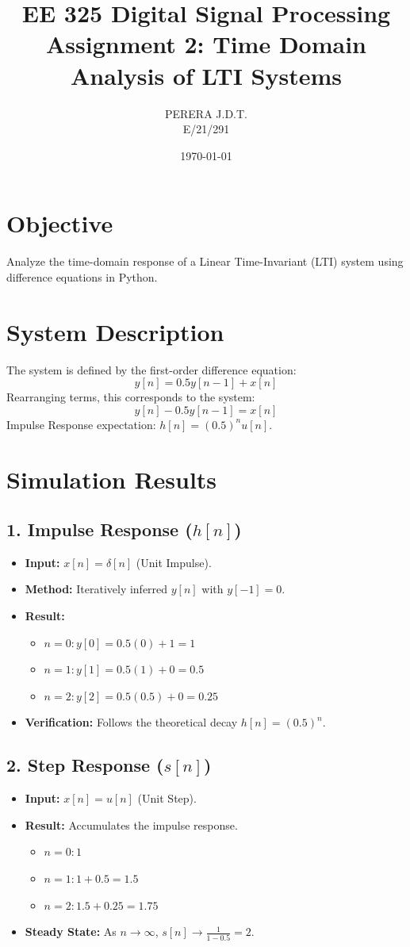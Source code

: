 \documentclass[11pt, a4paper]{article}
\title{EE 325 Digital Signal Processing \\ Assignment 2: Time Domain Analysis of LTI Systems}
\author{PERERA J.D.T. \\ E/21/291}
\date{\today}
\begin{document}
\maketitle

\section{Objective}
Analyze the time-domain response of a Linear Time-Invariant (LTI) system using difference equations in Python.

\section{System Description}
The system is defined by the first-order difference equation:
$$y[n] = 0.5 y[n-1] + x[n]$$
Rearranging terms, this corresponds to the system:
$$y[n] - 0.5 y[n-1] = x[n]$$
Impulse Response expectation: $h[n] = (0.5)^n u[n]$.

\section{Simulation Results}
\subsection{1. Impulse Response ($h[n]$)}
\begin{itemize}
    \item \textbf{Input:} $x[n] = \delta[n]$ (Unit Impulse).
    \item \textbf{Method:} Iteratively inferred $y[n]$ with $y[-1]=0$.
    \item \textbf{Result:}
    \begin{itemize}
        \item $n=0: y[0] = 0.5(0) + 1 = 1$
        \item $n=1: y[1] = 0.5(1) + 0 = 0.5$
        \item $n=2: y[2] = 0.5(0.5) + 0 = 0.25$
    \end{itemize}
    \item \textbf{Verification:} Follows the theoretical decay $h[n] = (0.5)^n$.
\end{itemize}

\subsection{2. Step Response ($s[n]$)}
\begin{itemize}
    \item \textbf{Input:} $x[n] = u[n]$ (Unit Step).
    \item \textbf{Result:} Accumulates the impulse response.
    \begin{itemize}
        \item $n=0: 1$
        \item $n=1: 1 + 0.5 = 1.5$
        \item $n=2: 1.5 + 0.25 = 1.75$
    \end{itemize}
    \item \textbf{Steady State:} As $n \to \infty$, $s[n] \to \frac{1}{1 - 0.5} = 2$.
\end{itemize}
\end{document}

